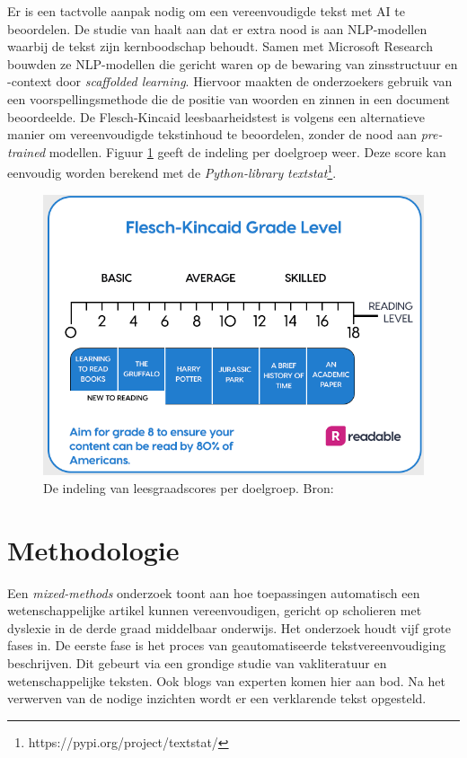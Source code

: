 Er is een tactvolle aanpak nodig om een vereenvoudigde tekst met AI te beoordelen. De studie van \textcite{Swayamdipta2019} haalt aan dat er extra nood is aan NLP-modellen waarbij de tekst zijn kernboodschap behoudt. Samen met Microsoft Research bouwden ze NLP-modellen die gericht waren op de bewaring van zinsstructuur en -context door \emph{scaffolded learning}. Hiervoor maakten de onderzoekers gebruik van een voorspellingsmethode die de positie van woorden en zinnen in een document beoordeelde. De Flesch-Kincaid leesbaarheidstest is volgens \newline \textcite{Readable2021} een alternatieve manier om vereenvoudigde tekstinhoud te beoordelen, zonder de nood aan \textit{pre-trained} modellen. Figuur \ref{img:readable-scheme} geeft de indeling per doelgroep weer. Deze score kan eenvoudig worden berekend met de \textit{Python-library} \textit{textstat}\footnote{https://pypi.org/project/textstat/}. 

\begin{figure}
	\includegraphics[width=\linewidth]{img/Screenshot_302.png}
	\caption{De indeling van leesgraadscores per doelgroep. Bron: \autocite{Readable2021}}
	\label{img:readable-scheme}
\end{figure}

\section{Methodologie}%
\label{sec:methodologie}
Een \textit{mixed-methods} onderzoek toont aan hoe toepassingen automatisch een wetenschappelijke artikel kunnen vereenvoudigen, gericht op scholieren met dyslexie in de derde graad middelbaar onderwijs. Het onderzoek houdt vijf grote fases in. De eerste fase is het proces van geautomatiseerde tekstvereenvoudiging beschrijven. Dit gebeurt via een grondige studie van vakliteratuur en wetenschappelijke teksten. Ook blogs van experten komen hier aan bod. Na het verwerven van de nodige inzichten wordt er een verklarende tekst opgesteld.

